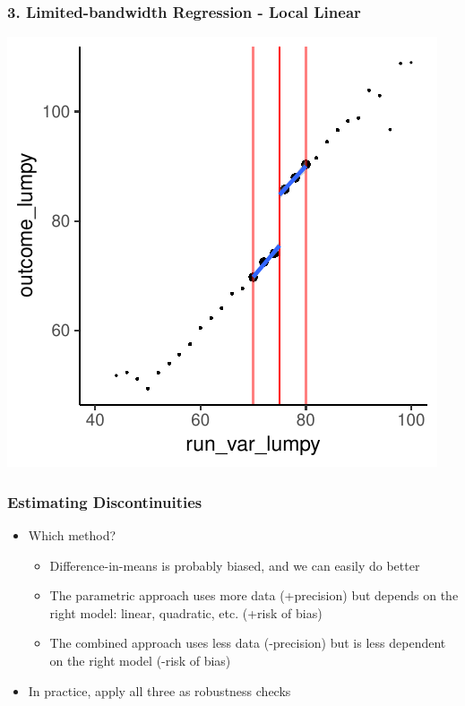 \documentclass[xcolor=x11names,compress]{beamer}\usepackage[]{graphicx}\usepackage[]{color}
\makeatletter
\def\maxwidth{ %
  \ifdim\Gin@nat@width>\linewidth
    \linewidth
  \else
    \Gin@nat@width
  \fi
}
\newenvironment{knitrout}{}{} %
\renewcommand{\(}{\begin{columns}}
\renewcommand{\)}{\end{columns}}
\newcommand{\<}[1]{\begin{column}{#1}}
\renewcommand{\>}{\end{column}}
\makeatother
\begin{document}
\begin{frame}
\frametitle{3. Limited-bandwidth Regression - Local Linear}
\begin{center}
\begin{knitrout}
\color{fgcolor}
\includegraphics[width=\maxwidth]{figure/chart6-1} 

\end{knitrout}
\end{center}
\end{frame}

\begin{frame}
\frametitle{Estimating Discontinuities}
\begin{itemize}
\item Which method?
\pause
\begin{itemize}
\item Difference-in-means is probably biased, and we can easily do better
\pause
\item The parametric approach uses more data (+precision) but depends on the right model: linear, quadratic, etc. (+risk of bias)
\pause
\item The combined approach uses less data (-precision) but is less dependent on the right model (-risk of bias)
\pause
\end{itemize}
\item In practice, apply all three as robustness checks
\end{itemize}
\end{frame}
\end{document}
